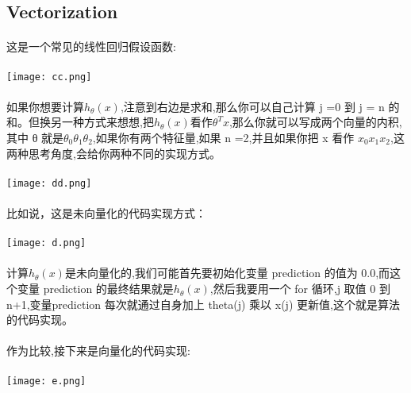 \documentclass{article}
\begin{document}
\begin{CJK}{UTF8}{gbsn}
\subsection{Vectorization}
\paragraph{}
这是一个常见的线性回归假设函数:
\paragraph{}
\texttt{[image: cc.png]}
\paragraph{}
如果你想要计算$h_{\theta}(x)$,注意到右边是求和,那么你可以自己计算 j =0 到 j = n 的和。但换另一种方式来想想,把$h_{\theta}(x)$看作$\theta^{T}x$,那么你就可以写成两个向量的内积,其中 θ 就是$\theta_{0}\theta_{1}\theta_{2}$,如果你有两个特征量,如果 n =2,并且如果你把 x 看作 $x_{0}x_{1}x_{2}$,这两种思考角度,会给你两种不同的实现方式。
\paragraph{}
\texttt{[image: dd.png]}
\paragraph{}
比如说，这是未向量化的代码实现方式：
\paragraph{}
\texttt{[image: d.png]}
\paragraph{}
计算$h_{\theta}(x)$是未向量化的,我们可能首先要初始化变量 prediction 的值为 0.0,而这个变量 prediction 的最终结果就是$h_{\theta}(x)$,然后我要用一个 for 循环,j 取值 0 到 n+1,变量prediction 每次就通过自身加上 theta(j) 乘以 x(j) 更新值,这个就是算法的代码实现。
\paragraph{}
作为比较,接下来是向量化的代码实现:
\paragraph{}
\texttt{[image: e.png]}

\end{CJK}
\end{document}
